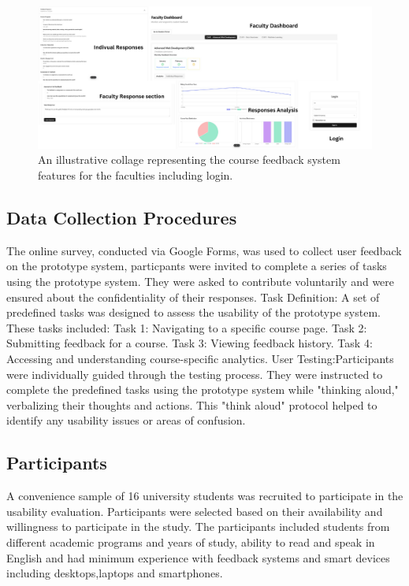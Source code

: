 \documentclass[conference]{IEEEtran}
\begin{document}
    \begin{figure}[!h]
        \centering
        \includegraphics[width=\linewidth]{faculty.png}
        \caption{An illustrative collage representing the course feedback system features for the faculties including login.}
        \label{fig:faculty_features}
        \end{figure}
    


\subsection{Data Collection Procedures}
The online survey, conducted via Google Forms, was used to collect user feedback on the prototype system, particpants were invited to complete a series of tasks using the prototype system. They were asked to contribute voluntarily and were ensured about the confidentiality of their responses.
Task Definition: A set of predefined tasks was designed to assess the usability of the prototype system. These tasks included:
     Task 1: Navigating to a specific course page.
    Task 2: Submitting feedback for a course.
     Task 3: Viewing feedback history.
     Task 4: Accessing and understanding course-specific analytics. 
User Testing:Participants were individually guided through the testing process. They were instructed to complete the predefined tasks using the prototype system while "thinking aloud," verbalizing their thoughts and actions. This "think aloud" protocol helped to identify any usability issues or areas of confusion.


\subsection{Participants}
A convenience sample of 16 university students was recruited to participate in the usability evaluation. Participants were selected based on their availability and willingness to participate in the study. The participants included students from different academic programs and years of study, ability to read and speak in English and had minimum experience with feedback systems and smart devices including desktops,laptops and smartphones.
\end{document}
